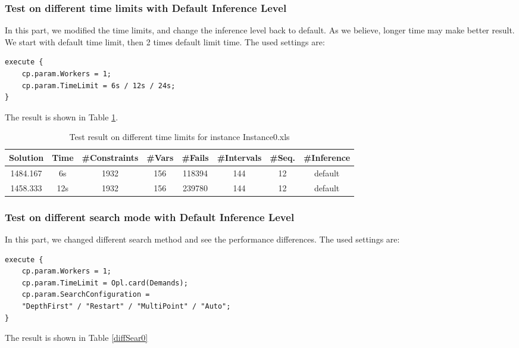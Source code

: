 \documentclass[a4paper, 12pt]{article}
\begin{document}
\subsubsection{Test on different time limits with Default Inference Level}

In this part, we modified the time limits, and change the inference level back to default. As we believe, longer time may make better result. We start with default time limit, then 2 times default limit time. The used settings are: 

\begin{lstlisting}
execute {
    cp.param.Workers = 1;
    cp.param.TimeLimit = 6s / 12s / 24s; 
}
\end{lstlisting}

The result is shown in Table \ref{diffTime0}.
\begin{table}
    \centering
    \caption{Test result on different time limits for instance Instance0.xls}
    \label{diffTime0}
    \begin{tabular}{|c|c|c|c|c|c|c|c|}
        \hline
        Solution & Time & \#Constraints & \#Vars & \#Fails & \#Intervals & \#Seq. & \#Inference \\
        \hline
        1484.167 & 6s & 1932 & 156 & 118394 & 144 & 12 & default \\
        \hline 
        1458.333 & 12s & 1932 & 156 & 239780 & 144 & 12 & default \\
        \hline
    \end{tabular}
\end{table}

\subsubsection{Test on different search mode with Default Inference Level}

In this part, we changed different search method and see the performance differences. The used settings are: 

\begin{lstlisting}
execute {
    cp.param.Workers = 1;
    cp.param.TimeLimit = Opl.card(Demands); 
    cp.param.SearchConfiguration = 
    "DepthFirst" / "Restart" / "MultiPoint" / "Auto";
}
\end{lstlisting}

The result is shown in Table \ref{diffSear0}
\end{document}
